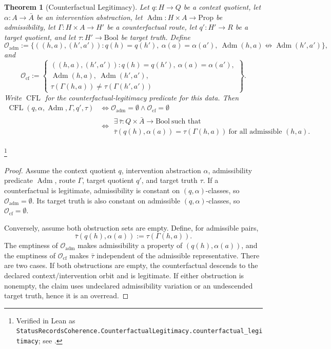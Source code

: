 \documentclass[11pt]{article}
\newtheorem{theorem}{Theorem}[section]
\theoremstyle{definition}
\begin{document}
\begin{theorem}[Counterfactual Legitimacy]\label{thm:F31}
Let \(q:H\to Q\) be a context quotient, let
\(\alpha:A\to\bar A\) be an intervention abstraction, let
\(\operatorname{Adm}:H\times A\to\mathrm{Prop}\) be admissibility, let
\(\Gamma:H\times A\to H'\) be a counterfactual route, let
\(q':H'\to R\) be a target quotient, and let
\(\tau:H'\to\mathrm{Bool}\) be target truth.  Define
\[
  \mathcal O_{\mathrm{adm}}
  :=
  \{((h,a),(h',a')) :
    q(h)=q(h'),\ \alpha(a)=\alpha(a'),\
    \operatorname{Adm}(h,a)\not\leftrightarrow
    \operatorname{Adm}(h',a')\},
\]
and
\[
  \mathcal O_{\mathrm{cf}}
  :=
  \left\{
  \begin{array}{l}
    ((h,a),(h',a')) :
    q(h)=q(h'),\ \alpha(a)=\alpha(a'),\\
    \operatorname{Adm}(h,a),\ \operatorname{Adm}(h',a'),\\
    \tau(\Gamma(h,a))\ne\tau(\Gamma(h',a'))
  \end{array}
  \right\}.
\]
Write \(\operatorname{CFL}\) for the counterfactual-legitimacy
predicate for this data.  Then
\begin{align*}
  \operatorname{CFL}(q,\alpha,\operatorname{Adm},\Gamma,q',\tau)
  &\iff
  \mathcal O_{\mathrm{adm}}=\emptyset
  \wedge
  \mathcal O_{\mathrm{cf}}=\emptyset\\
  &\iff
  \begin{gathered}
    \exists\,\bar\tau:Q\times\bar A\to\mathrm{Bool}
    \ \text{such that}\\
    \bar\tau(q(h),\alpha(a))=\tau(\Gamma(h,a))
    \ \text{for all admissible }(h,a).
  \end{gathered}
\end{align*}
\end{theorem}
\footnote{\raggedright Verified in Lean as
\texttt{StatusRecordsCoherence.CounterfactualLegitimacy.\allowbreak{}counterfactual\_legitimacy};
see \Cref{app:formalization}.}
\begin{proof}
Assume the context quotient \(q\), intervention abstraction
\(\alpha\), admissibility predicate \(\operatorname{Adm}\), route
\(\Gamma\), target quotient \(q'\), and target truth \(\tau\).  If a
counterfactual is legitimate, admissibility is constant on
\((q,\alpha)\)-classes, so
\(\mathcal O_{\mathrm{adm}}=\emptyset\).  Its target truth is also
constant on admissible \((q,\alpha)\)-classes, so
\(\mathcal O_{\mathrm{cf}}=\emptyset\).

Conversely, assume both obstruction sets are empty.  Define, for
admissible pairs,
\[
  \bar\tau(q(h),\alpha(a)):=\tau(\Gamma(h,a)).
\]
The emptiness of \(\mathcal O_{\mathrm{adm}}\) makes admissibility a
property of \((q(h),\alpha(a))\), and the emptiness of
\(\mathcal O_{\mathrm{cf}}\) makes \(\bar\tau\) independent of the
admissible representative.  There are two cases.  If both
obstructions are empty, the counterfactual descends to the declared
context/intervention orbit and is legitimate.  If either obstruction
is nonempty, the claim uses undeclared admissibility variation or an
undescended target truth, hence it is an overread.
\end{proof}
\end{document}
